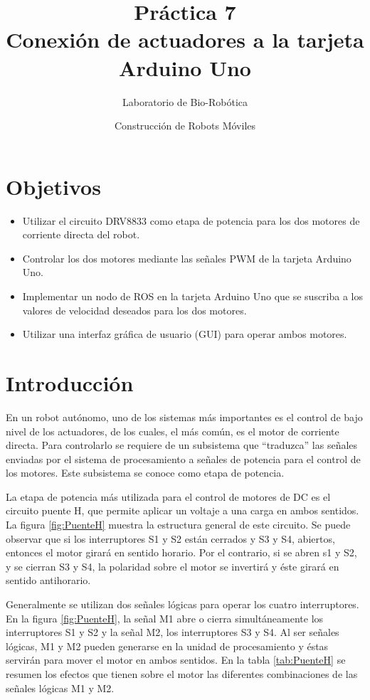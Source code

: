 \documentclass[a4paper,12pt]{article}
\title{Práctica 7 \\ Conexión de actuadores a la tarjeta Arduino Uno}
\author{Laboratorio de Bio-Robótica}
\date{Construcción de Robots Móviles}
\begin{document}
\renewcommand{\tablename}{Tabla}
\maketitle
\section*{Objetivos}
\begin{itemize}
\item Utilizar el circuito DRV8833 como etapa de potencia para los dos motores de corriente directa del robot. 
\item Controlar los dos motores mediante las señales PWM de la tarjeta Arduino Uno.
\item Implementar un nodo de ROS en la tarjeta Arduino Uno que se suscriba a los valores de velocidad deseados para los dos motores. 
\item Utilizar una interfaz gráfica de usuario (GUI) para operar ambos motores. 
\end{itemize}

\section{Introducción}
En un robot autónomo, uno de los sistemas más importantes es el control de bajo nivel de los actuadores, de los cuales, el más común, es el motor de corriente directa. Para controlarlo se requiere de un subsistema que ``traduzca'' las señales enviadas por el sistema de procesamiento a señales de potencia para el control de los motores. Este subsistema se conoce como etapa de potencia. 

La etapa de potencia más utilizada para el control de motores de DC es el circuito puente H, que permite aplicar un voltaje a una carga en ambos sentidos. La figura \ref{fig:PuenteH} muestra la estructura general de este circuito. Se puede observar que si los interruptores S1 y S2 están cerrados y S3 y S4, abiertos, entonces el motor girará en sentido horario. Por el contrario, si se abren s1 y S2, y se cierran S3 y S4, la polaridad sobre el motor se invertirá y éste girará en sentido antihorario. 

Generalmente se utilizan dos señales lógicas para operar los cuatro interruptores. En la figura \ref{fig:PuenteH}, la señal M1 abre o cierra simultáneamente los interruptores S1 y S2 y la señal M2, los interruptores S3 y S4. Al ser señales lógicas, M1 y M2 pueden generarse en la unidad de procesamiento y éstas servirán para mover el motor en ambos sentidos. En la tabla \ref{tab:PuenteH} se resumen los efectos que tienen sobre el motor las diferentes combinaciones de las señales lógicas M1 y M2. 
\end{document}
